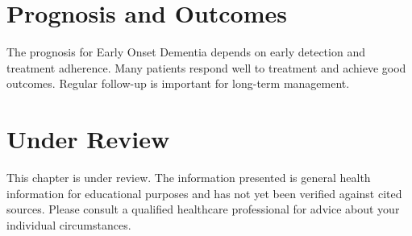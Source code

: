 \section*{Prognosis and Outcomes}
The prognosis for Early Onset Dementia depends on early detection and treatment adherence. Many patients respond well to treatment and achieve good outcomes. Regular follow-up is important for long-term management.
\section*{Under Review}
This chapter is under review. The information presented is general health information for educational purposes and has not yet been verified against cited sources. Please consult a qualified healthcare professional for advice about your individual circumstances.


\clearpage
